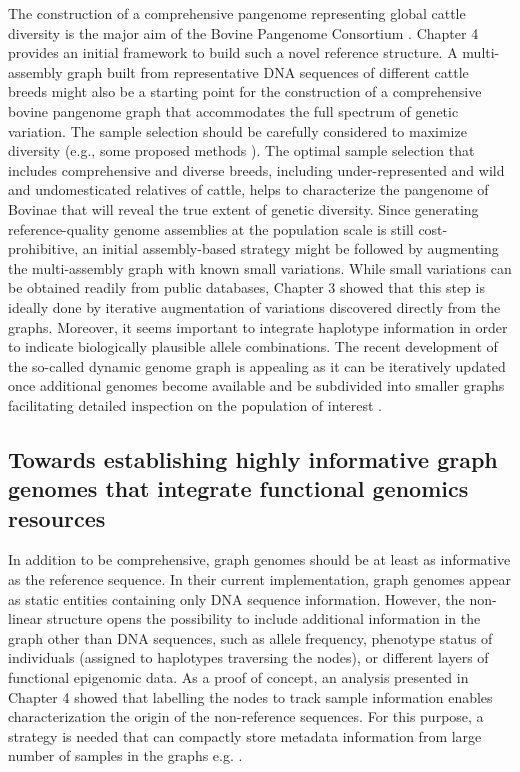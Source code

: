 \documentclass[../main.tex]{subfiles}
\begin{document}
The construction of a comprehensive pangenome representing global cattle diversity is the major aim of the Bovine Pangenome Consortium \citep{Smith2020}. Chapter 4 provides an initial framework to build such a novel reference structure. A multi-assembly graph built from representative DNA sequences of different cattle breeds might also be a starting point for the construction of a comprehensive bovine pangenome graph that accommodates the full spectrum of genetic variation. The sample selection should be carefully considered to maximize diversity (e.g., some proposed methods \citep{Ros-Freixedes2017,ranallo2021optimized}). The optimal sample selection that includes comprehensive and diverse breeds, including under-represented and wild and undomesticated relatives of cattle, helps to characterize the pangenome of Bovinae that will reveal the true extent of genetic diversity. Since generating reference-quality genome assemblies at the population scale is still cost-prohibitive, an initial assembly-based strategy might be followed by augmenting the multi-assembly graph with known small variations. While small variations can be obtained readily from public databases, Chapter 3 showed that this step is ideally done by iterative augmentation of variations discovered directly from the graphs. Moreover, it seems important to integrate haplotype information in order to indicate biologically plausible allele combinations. The recent development of the so-called dynamic genome graph is appealing as it can be iteratively updated once additional genomes become available and be subdivided into smaller graphs facilitating detailed inspection on the population of interest \citep{eizenga2020efficient}.


\subsection*{Towards establishing highly informative graph genomes that integrate functional genomics resources}

In addition to be comprehensive, graph genomes should be at least as informative as the reference sequence. In their current implementation, graph genomes appear as static entities containing only DNA sequence information. However, the non-linear structure opens the possibility to include additional information in the graph other than DNA sequences, such as allele frequency, phenotype status of individuals (assigned to haplotypes traversing the nodes), or different layers of functional epigenomic data. As a proof of concept, an analysis presented in Chapter 4 showed that labelling the nodes to track sample information enables characterization the origin of the non-reference sequences. For this purpose, a strategy is needed that can compactly store metadata information from large number of samples in the graphs e.g. \citet{siren2020haplotype}. 
\end{document}

